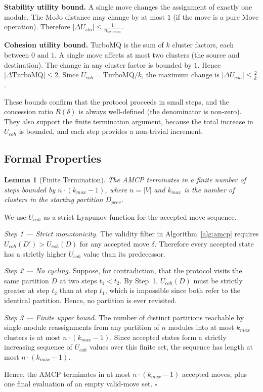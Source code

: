 \documentclass[conference]{IEEEtran}
\newtheorem{lemma}{Lemma}
\renewenvironment{proof}{{\bfseries Proof.}}{\hfill$\square$}
\begin{document}
\textbf{Stability utility bound.} A single move changes the assignment of exactly one module. The MoJo distance may change by at most $1$ (if the move is a pure Move operation). Therefore $|\Delta U_{sta}| \le \frac{1}{n_{common}}$.

\textbf{Cohesion utility bound.} TurboMQ is the sum of $k$ cluster factors, each between $0$ and $1$. A single move affects at most two clusters (the source and destination). The change in any cluster factor is bounded by $1$. Hence $|\Delta \mathrm{TurboMQ}| \le 2$. Since $U_{coh} = \mathrm{TurboMQ}/k$, the maximum change is $|\Delta U_{coh}| \le \frac{2}{k}$.

These bounds confirm that the protocol proceeds in small steps, and the concession ratio $R(\delta)$ is always well‑defined (the denominator is non‑zero). They also support the finite termination argument, because the total increase in $U_{coh}$ is bounded, and each step provides a non‑trivial increment.

\subsection{Formal Properties}

\begin{lemma}[Finite Termination]
\label{lem:termination}
The AMCP terminates in a finite number of steps bounded by $n\cdot(k_{max}-1)$, where $n=|V|$ and $k_{max}$ is the number of clusters in the starting partition $D_{prev}$.
\end{lemma}
\begin{proof}
We use $U_{coh}$ as a strict Lyapunov function for the accepted move sequence.

\noindent\textit{Step 1 — Strict monotonicity.} The validity filter in Algorithm~\ref{alg:amcp} requires $U_{coh}(D')>U_{coh}(D)$ for any accepted move $\delta$. Therefore every accepted state has a strictly higher $U_{coh}$ value than its predecessor.

\noindent\textit{Step 2 — No cycling.} Suppose, for contradiction, that the protocol visits the same partition $D$ at two steps $t_1 < t_2$. By Step~1, $U_{coh}(D)$ must be strictly greater at step $t_2$ than at step $t_1$, which is impossible since both refer to the identical partition. Hence, no partition is ever revisited.

\noindent\textit{Step 3 — Finite upper bound.} The number of distinct partitions reachable by single‑module reassignments from any partition of $n$ modules into at most $k_{max}$ clusters is at most $n\cdot(k_{max}-1)$. Since accepted states form a strictly increasing sequence of $U_{coh}$ values over this finite set, the sequence has length at most $n\cdot(k_{max}-1)$.

Hence, the AMCP terminates in at most $n\cdot(k_{max}-1)$ accepted moves, plus one final evaluation of an empty valid‑move set.
\end{proof}
\end{document}
